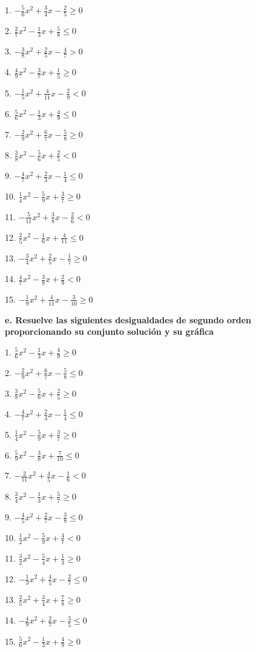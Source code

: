 \documentclass[]{book}
\begin{document}
\begin{multicols}{2}
1. $-\frac{5}{6}x^2 + \frac{3}{4}x - \frac{2}{5} \geq 0$

2. $\frac{2}{7}x^2 - \frac{1}{3}x + \frac{5}{8} \leq 0$

3. $-\frac{3}{8}x^2 + \frac{2}{5}x - \frac{4}{7} > 0$

4. $\frac{4}{9}x^2 - \frac{3}{7}x + \frac{1}{5} \geq 0$

5. $-\frac{1}{5}x^2 + \frac{4}{11}x - \frac{2}{9} < 0$

6. $\frac{5}{6}x^2 - \frac{1}{3}x + \frac{4}{9} \leq 0$

7. $-\frac{2}{9}x^2 + \frac{6}{7}x - \frac{5}{8} \geq 0$

8. $\frac{3}{8}x^2 - \frac{5}{6}x + \frac{2}{5} < 0$

9. $-\frac{4}{7}x^2 + \frac{2}{3}x - \frac{1}{4} \leq 0$

10. $\frac{1}{4}x^2 - \frac{5}{9}x + \frac{3}{7} \geq 0$

11. $-\frac{5}{11}x^2 + \frac{3}{8}x - \frac{2}{6} < 0$

12. $\frac{2}{5}x^2 - \frac{1}{6}x + \frac{4}{11} \leq 0$

13. $-\frac{3}{4}x^2 + \frac{2}{5}x - \frac{1}{7} \geq 0$

14. $\frac{4}{7}x^2 - \frac{3}{8}x + \frac{2}{9} < 0$

15. $-\frac{1}{9}x^2 + \frac{4}{11}x - \frac{3}{10} \geq 0$
\end{multicols}

\textbf{e. Resuelve las siguientes desigualdades de segundo orden
proporcionando su conjunto solución y su gráfica}

\begin{multicols}{2}
1. $\frac{5}{6}x^2 - \frac{1}{3}x + \frac{4}{9} \geq 0$

2. $-\frac{2}{9}x^2 + \frac{6}{7}x - \frac{5}{8} \leq 0$

3. $\frac{3}{8}x^2 - \frac{5}{6}x + \frac{2}{5} \geq 0$

4. $-\frac{4}{7}x^2 + \frac{2}{3}x - \frac{1}{4} \leq 0$

5. $\frac{1}{4}x^2 - \frac{5}{9}x + \frac{3}{7} \geq 0$

6. $\frac{5}{9}x^2 - \frac{3}{8}x + \frac{7}{10} \leq 0$

7. $-\frac{2}{11}x^2 + \frac{4}{5}x - \frac{1}{6} < 0$

8. $\frac{3}{4}x^2 - \frac{1}{3}x + \frac{5}{7} \geq 0$

9. $-\frac{4}{5}x^2 + \frac{2}{7}x - \frac{3}{8} \leq 0$

10. $\frac{1}{2}x^2 - \frac{5}{9}x + \frac{4}{7} < 0$

11. $\frac{3}{2}x^2 - \frac{5}{4}x + \frac{1}{3} \geq 0$

12. $-\frac{1}{3}x^2 + \frac{4}{5}x - \frac{2}{7} \leq 0$

13. $\frac{2}{5}x^2 + \frac{3}{4}x + \frac{7}{8} \geq 0$

14. $-\frac{4}{9}x^2 + \frac{2}{7}x - \frac{3}{5} \leq 0$

15. $\frac{5}{6}x^2 - \frac{1}{3}x + \frac{4}{9} \geq 0$
\end{multicols}
\end{document}
